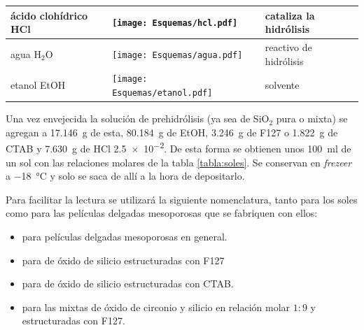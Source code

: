 \begin{table}[ht!]
\begin{tabular}{>{\raggedright\arraybackslash}m{2.40cm}>{\centering\arraybackslash}m{4cm}>{\centering\arraybackslash}m{2.35cm}>{\raggedright\arraybackslash}m{1.7cm}}
				  		  ácido clohídrico HCl& \texttt{[image: Esquemas/hcl.pdf]}  & \multirow{1}{*}{$36,46$}   & cataliza la hidrólisis \\ \midrule
				  		  agua \hspace{2cm} H$_2$O  &  \texttt{[image: Esquemas/agua.pdf]}  & \multirow{1}{*}{$18,02$}   & reactivo de hidrólisis \\ \midrule
				  		  etanol \hspace{2cm} EtOH  & \texttt{[image: Esquemas/etanol.pdf]}  & \multirow{1}{*}{$46,07$}   & solvente \\ 
				  		  \bottomrule
				    	  \end{tabular}
				   		  \label{tabla:reactivos}
					      \end{table}

			Una vez envejecida la solución de prehidrólisis (ya sea de SiO$_2$ pura o mixta) se agregan a \SI{17.146}{\gram} de esta, \SI{80.184}{\gram} de EtOH, \SI{3.246}{\gram} de F127 o \SI{1.822}{\gram} de CTAB y \SI{7.630}{\gram} de HCl \SI{2,5e-2}{\Molar}. De esta forma se obtienen unos \SI{100}{\ml} de un sol con las relaciones molares de la tabla \ref{tabla:soles}. Se conservan en \textit{frezeer} a \SI{-18}{\celsius} y solo se saca de allí a la hora de depositarlo. 

			Para facilitar la lectura se utilizará la siguiente nomenclatura, tanto para los soles como para las películas delgadas mesoporosas que se fabriquen con ellos: 

				\begin{itemize}
			 			\item \pdm\space para películas delgadas mesoporosas en general.
			 			\item \pdmF\space para \pdm\space de óxido de silicio estructuradas con F127 
			 			\item \pdmC\space para \pdm\space de óxido de silicio estructuradas con CTAB.
			 			\item \pdmZ\space para las \pdm\space mixtas de óxido de circonio y silicio en relación molar $1\!:\!9$ y estructuradas con F127. 
					    \end{itemize}	
			
